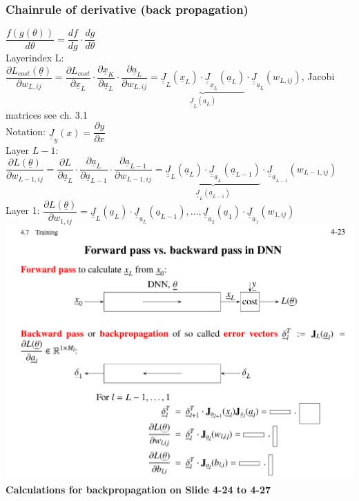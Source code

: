 \subsubsection{Chainrule of derivative (back propagation)} 
$\dfrac{ f(g(\theta))}{d \theta} = \dfrac{df}{dg} \cdot \dfrac{dg}{d \theta} $ \\
Layerindex L: $  \dfrac{\partial L_{cost}(\underline{\theta})}{\partial w_{L,ij}} = \dfrac{\partial L_{cost} }{\partial \underline{x}_{L}} \cdot \dfrac{\partial \underline{x}_K}{\partial \underline{a}_L} \cdot \dfrac{\partial \underline{a}_L }{\partial w_{L,ij}} = \underbrace{ \underline{\underline{J}}_L (\underline{x}_L) \cdot \underline{\underline{J}}_{\underline{x}_L}(\underline{a}_L)}_{\underline{\underline{J}}_L (\underline{a}_L)} \cdot \underline{\underline{J}}_{\underline{a}_L} (w_{L,ij}) $, Jacobi matrices see ch. 3.1\\
Notation: $ \underline{\underline{J}}_y (x ) = \dfrac{\partial y}{\partial x}  $ \\
Layer $ L-1$:\\
$ \dfrac{\partial L (\underline{\theta})}{\partial w _{L-1, ij}} = \dfrac{\partial L}{\partial \underline{a}_L} \cdot \dfrac{\partial \underline{a}_L}{\partial \underline{a}_{L-1}} \cdot \dfrac{\partial  \underline{a}_{L-1}}{\partial w_{L-1,ij}} = \underbrace{ \underline{\underline{J}}_L (\underline{a}_L) \cdot \underline{\underline{J}}_{\underline{a}_L} (\underline{a}_{L-1})}_{\underline{\underline{J}}_L(\underline{a}_{L-1})} \cdot \underline{\underline{J}}_{\underline{a}_{L-1}}(w_{L-1,ij}) $ \\
Layer 1: $ \dfrac{\partial L (\underline{\theta})}{\partial w_{1,ij}} = \underline{\underline{J}}_L ( \underline{a}_L) \cdot \underline{\underline{J}}_{\underline{a}_L}(\underline{a}_{L-1}) , ..., \underline{\underline{J}}_{\underline{a}_2}(\underline{a}_1) \cdot \underline{\underline{J}}_{\underline{a}_1} (w_{1,ij}) $ \\
\includegraphics[width = \linewidth]{Images/Training423.png}\\
\textbf{Calculations for backpropagation on Slide 4-24 to 4-27}\\







